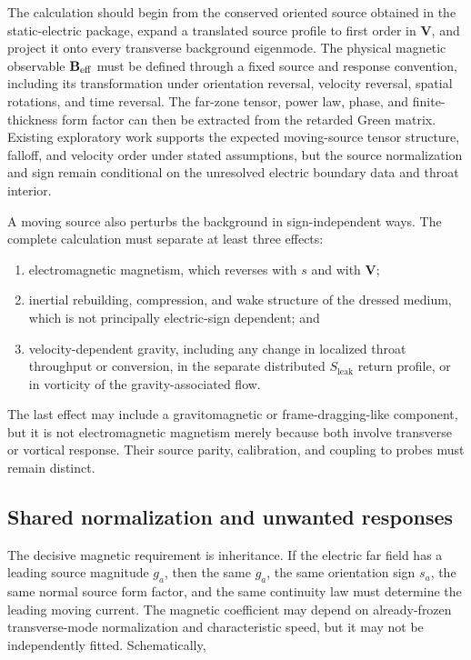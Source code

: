 The calculation should begin from the conserved oriented source obtained in the
static-electric package, expand a translated source profile to first order in
\(\mathbf V\), and project it onto every transverse background eigenmode. The
physical magnetic observable \(\mathbf B_{\rm eff}\) must be defined through a
fixed source and response convention, including its transformation under
orientation reversal, velocity reversal, spatial rotations, and time reversal.
The far-zone tensor, power law, phase, and finite-thickness form factor can then
be extracted from the retarded Green matrix. Existing exploratory work supports
the expected moving-source tensor structure, falloff, and velocity order under
stated assumptions, but the source normalization and sign remain conditional on
the unresolved electric boundary data and throat interior.

A moving source also perturbs the background in sign-independent ways. The
complete calculation must separate at least three effects:

\begin{enumerate}[leftmargin=2.2em,itemsep=0.35em]
  \item electromagnetic magnetism, which reverses with \(s\) and with
        \(\mathbf V\);
  \item inertial rebuilding, compression, and wake structure of the dressed
        medium, which is not principally electric-sign dependent; and
  \item velocity-dependent gravity, including any change in localized throat
        throughput or conversion, in the separate distributed
        \(S_{\mathrm{leak}}\) return profile, or in vorticity of the
        gravity-associated flow.
\end{enumerate}

The last effect may include a gravitomagnetic or frame-dragging-like component,
but it is not electromagnetic magnetism merely because both involve transverse
or vortical response. Their source parity, calibration, and coupling to probes
must remain distinct.

\subsection{Shared normalization and unwanted responses}

The decisive magnetic requirement is inheritance. If the electric far field
has a leading source magnitude \(g_a\), then the same \(g_a\), the same
orientation sign \(s_a\), the same normal source form factor, and the same
continuity law must determine the leading moving current. The magnetic
coefficient may depend on already-frozen transverse-mode normalization and
characteristic speed, but it may not be independently fitted. Schematically,

